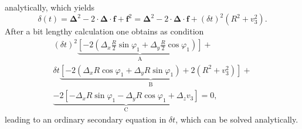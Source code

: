 analytically, which yields
\begin{equation}
	\delta (t) = \boldsymbol{\Delta}^2 - 2 \cdot \boldsymbol{\Delta}\cdot\boldsymbol{f} + \boldsymbol{f}^2 = \boldsymbol{\Delta}^2- 2 \cdot \boldsymbol{\Delta}\cdot\boldsymbol{f}+(\delta t)^2 (R^2+v^2_3).
\end{equation}
After a bit lengthy calculation one obtains as condition
\begin{multline}
	(\delta t)^2 \underbrace{\left[-2\left(\Delta_x \frac{R}{2}\sin\varphi_1+ \Delta_y\frac{R}{2}\cos\varphi_1\right)\right]}_\text{A} + \\
	\delta t \underbrace{\left[-2(\Delta_x R\cos\varphi_1 + \Delta_y R \sin\varphi_1)+2(R^2+v^2_3)\right]}_\text{B} + \\
	\underbrace{-2 \left[-\Delta_x R \sin\varphi_1-\Delta_y R \cos\varphi_1+\Delta_z v_3\right]}_\text{C}=0,
\end{multline}
leading to an ordinary secondary equation in $\delta t$, which can be solved analytically.